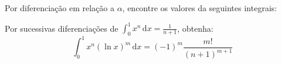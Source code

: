 \documentclass[11pt, a5paper]{exam}
\DeclareMathOperator{\arcsen}{arcsen}
\newcommand{\dd}{\,\mathrm{d}}
\begin{document}
\begin{questions}
\begin{multicols}{2}
\end{multicols}

\question 
Por diferenciação em relação a $ \alpha $, encontre os valores da seguintes 
integrais:
\begin{multicols}{2}
\end{multicols}

\question 
Por sucessivas diferenciações de 
$ \displaystyle \int_{0}^{1} x^n \dd{x} = \frac{1}{n + 1} $, obtenha:
\[
  \int_{0}^{1} x^n\left( \ln{x} \right)^{m} \dd{x} = (-1)^{m} \frac{m!}{(n + 1)^{m + 1}}
\]


\end{questions}
\end{document}

